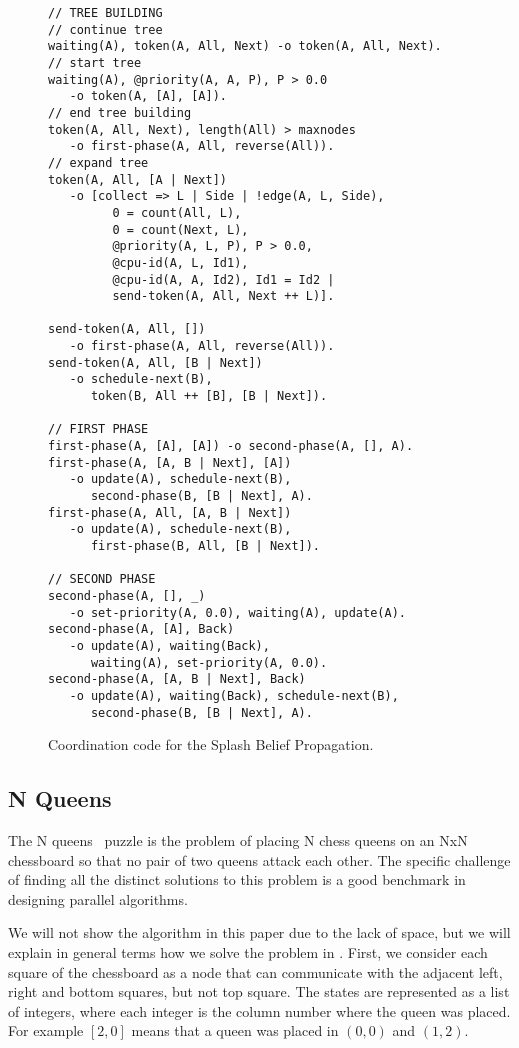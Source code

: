 \begin{figure}[h!]
\small\begin{verbatim}
// TREE BUILDING
// continue tree
waiting(A), token(A, All, Next) -o token(A, All, Next).
// start tree
waiting(A), @priority(A, A, P), P > 0.0
   -o token(A, [A], [A]).
// end tree building
token(A, All, Next), length(All) > maxnodes
   -o first-phase(A, All, reverse(All)).
// expand tree
token(A, All, [A | Next])
   -o [collect => L | Side | !edge(A, L, Side),
         0 = count(All, L),
         0 = count(Next, L),
         @priority(A, L, P), P > 0.0,
         @cpu-id(A, L, Id1),
         @cpu-id(A, A, Id2), Id1 = Id2 |
         send-token(A, All, Next ++ L)].

send-token(A, All, [])
   -o first-phase(A, All, reverse(All)).
send-token(A, All, [B | Next])
   -o schedule-next(B),
      token(B, All ++ [B], [B | Next]).

// FIRST PHASE
first-phase(A, [A], [A]) -o second-phase(A, [], A).
first-phase(A, [A, B | Next], [A])
   -o update(A), schedule-next(B),
      second-phase(B, [B | Next], A).
first-phase(A, All, [A, B | Next])
   -o update(A), schedule-next(B),
      first-phase(B, All, [B | Next]).

// SECOND PHASE
second-phase(A, [], _)
   -o set-priority(A, 0.0), waiting(A), update(A).
second-phase(A, [A], Back)
   -o update(A), waiting(Back),
      waiting(A), set-priority(A, 0.0).
second-phase(A, [A, B | Next], Back)
   -o update(A), waiting(Back), schedule-next(B),
      second-phase(B, [B | Next], A).
\end{verbatim}
  \caption{Coordination code for the Splash Belief Propagation.}
  \label{code:sbp}
\end{figure}
\normalsize

\subsection{N Queens}

The N queens~\cite{8queens} puzzle is the problem of placing N chess queens on an NxN chessboard so
that no pair of two queens attack each other. The specific challenge of finding all the distinct
solutions to this problem is a good benchmark in designing parallel algorithms.

We will not show the algorithm in this paper due to the lack of space, but we will explain in general
terms how we solve the problem in \lang. First, we consider each square of the chessboard as a node
that can communicate with the adjacent left, right and bottom squares, but not top square.
The states are represented as a list of integers, where each integer is the column number where
the queen was placed. For example $[2, 0]$ means that a queen was placed in $(0, 0)$ and $(1, 2)$.

